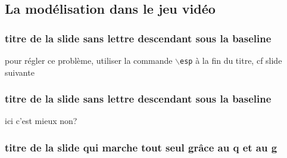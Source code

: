 \subsection{La modélisation dans le jeu vidéo}
\begin{frame}
\frametitle{titre de la slide sans lettre descendant sous la baseline}
pour régler ce problème, utiliser la commande \texttt{$\backslash$esp} à la fin du titre, cf slide suivante
\end{frame}


\begin{frame}
\frametitle{titre de la slide sans lettre descendant sous la baseline\esp}
ici c'est mieux non?
\end{frame}


\begin{frame}[fragile]
\frametitle{titre de la slide qui marche tout seul grâce au q et au g}
\end{frame}
